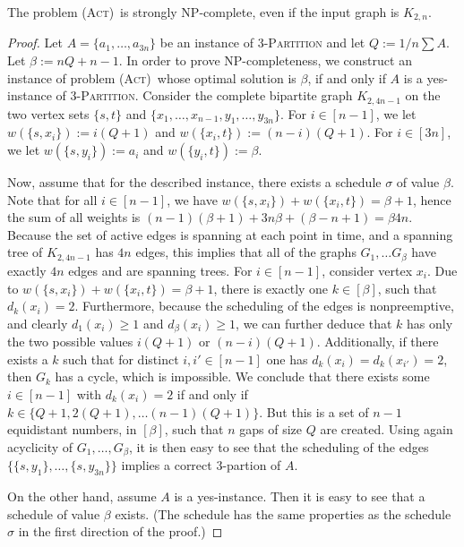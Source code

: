 \documentclass[runningheads]{llncs}
\numberwithin{equation}{section}
\newcommand{\set}[1]{\{ #1 \}}
\newcommand{\fromto}[2]{\set{#1, \ldots, #2}}
\newcommand{\act}{\textsc{(Act)}}
\begin{document}
\begin{theorem}
\label{thm:hardness_complete_bipartite}
The problem \act\ is strongly NP-complete, even if the input graph is $K_{2,n}$.
\end{theorem}
\begin{proof}
Let $A = \fromto{a_1}{a_{3n}}$ be an instance of \textsc{3-Partition} and let $Q := 1/n \sum A$. Let $\beta := nQ + n - 1$. In order to prove NP-completeness, we construct an instance of problem \act\ whose optimal solution is $\beta$, if and only if $A$ is a yes-instance of \textsc{3-Partition}. Consider the  complete bipartite graph $K_{2,4n-1}$ on the two vertex sets $\set{s, t}$ and $\set{x_1, \ldots, x_{n-1}, y_1, \ldots, y_{3n}}$. For $i \in [n-1]$, we let $w(\set{s,x_i}) := i(Q + 1)$ and $w(\set{x_i,t}) := (n - i)(Q + 1)$. For $i \in [3n]$, we let $w(\set{s,y_i}) := a_i$ and $w(\set{y_i,t}) := \beta$. 

Now, assume that for the described instance, there exists a schedule $\sigma$ of value $\beta$. Note that for all $i \in [n-1]$, we have $w(\set{s,x_i}) + w(\set{x_i,t}) = \beta + 1$, hence the sum of all weights is $(n-1)(\beta + 1) + 3n\beta + (\beta - n + 1) = \beta 4n$. Because the set of active edges is spanning at each point in time, and a spanning tree of $K_{2, 4n-1}$ has $4n$ edges, this implies that all of the graphs $G_1, \dots G_\beta$ have exactly $4n$ edges and are spanning trees. For $i \in [n-1
]$, consider vertex $x_i$.  Due to $w(\set{s,x_i}) + w(\set{x_i,t}) = \beta + 1$, there is exactly one $k \in [\beta]$, such that $d_k(x_i) = 2$. Furthermore, because the scheduling of the edges is nonpreemptive, and clearly $d_1(x_i) \geq 1$ and $d_\beta(x_i) \geq 1$, we can further deduce that $k$ has only the two possible values $i(Q+1)$ or $(n-i)(Q+1)$. Additionally, if there exists a $k$ such that for distinct $i, i' \in [n-1]$ one has $d_k(x_i) = d_k(x_{i'}) = 2$, then $G_k$ has a cycle, which is impossible. We conclude that there exists some $i \in [n-1]$ with $d_k(x_i) = 2$ if and only if $k \in \set{Q+1, 2(Q+1), \dots (n-1)(Q+1)}$. But this is a set of $n-1$ equidistant numbers, in $[\beta]$, such that $n$ gaps of size $Q$ are created. Using again acyclicity of $G_1, \dots, G_\beta$, it is then easy to see that the scheduling of the edges $\fromto{\set{s,y_1}}{\set{s,y_{3n}}}$ implies a correct 3-partion of $A$.

On the other hand, assume $A$ is a yes-instance. Then it is easy to see that a schedule of value $\beta$ exists. (The schedule has the same properties as the schedule $\sigma$ in the first direction of the proof.)
\end{proof}
\end{document}
